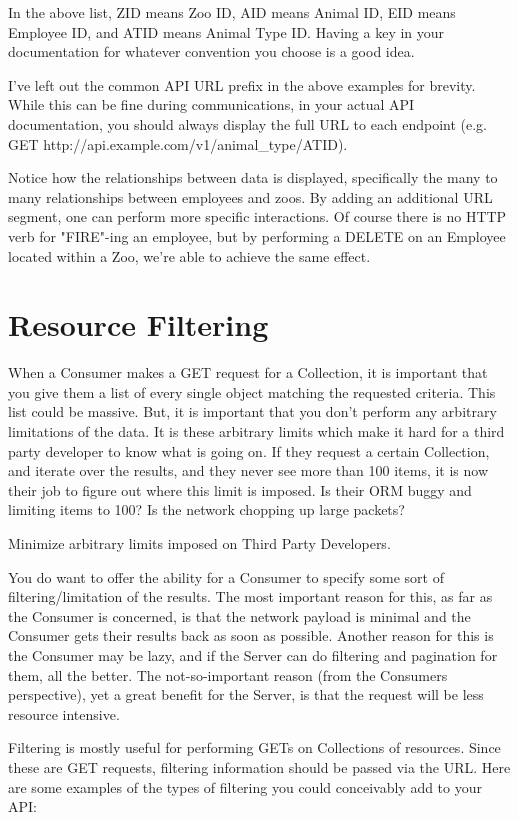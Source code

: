 \documentclass{book}
\begin{document}
In the above list, ZID means Zoo ID, AID means Animal ID, EID means Employee ID, and ATID means Animal Type ID. Having a key in your documentation for whatever convention you choose is a good idea.

I've left out the common API URL prefix in the above examples for brevity. While this can be fine during communications, in your actual API documentation, you should always display the full URL to each endpoint (e.g. GET http://api.example.com/v1/animal\_type/ATID).

Notice how the relationships between data is displayed, specifically the many to many relationships between employees and zoos. By adding an additional URL segment, one can perform more specific interactions. Of course there is no HTTP verb for "FIRE"-ing an employee, but by performing a DELETE on an Employee located within a Zoo, we're able to achieve the same effect.


\chapter{Resource Filtering}

When a Consumer makes a GET request for a Collection, it is important that you give them a list of every single object matching the requested criteria. This list could be massive. But, it is important that you don't perform any arbitrary limitations of the data. It is these arbitrary limits which make it hard for a third party developer to know what is going on. If they request a certain Collection, and iterate over the results, and they never see more than 100 items, it is now their job to figure out where this limit is imposed. Is their ORM buggy and limiting items to 100? Is the network chopping up large packets?

Minimize arbitrary limits imposed on Third Party Developers.

You do want to offer the ability for a Consumer to specify some sort of filtering/limitation of the results. The most important reason for this, as far as the Consumer is concerned, is that the network payload is minimal and the Consumer gets their results back as soon as possible. Another reason for this is the Consumer may be lazy, and if the Server can do filtering and pagination for them, all the better. The not-so-important reason (from the Consumers perspective), yet a great benefit for the Server, is that the request will be less resource intensive.

Filtering is mostly useful for performing GETs on Collections of resources. Since these are GET requests, filtering information should be passed via the URL. Here are some examples of the types of filtering you could conceivably add to your API:
\end{document}

